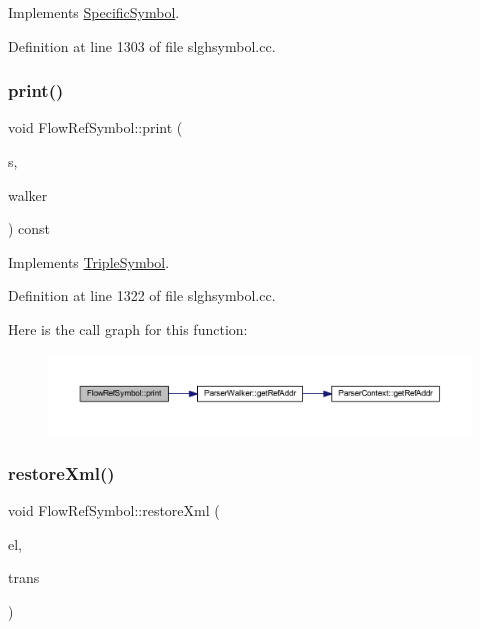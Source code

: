 Implements \mbox{\hyperlink{class_specific_symbol_abbde46a1f6af6c373420773d45e1e4e2}{Specific\+Symbol}}.



Definition at line 1303 of file slghsymbol.\+cc.

\mbox{\label{class_flow_ref_symbol_a8f6e9171c4a26b35f20e6026aafa94a2}} 
\subsubsection{\texorpdfstring{print()}{print()}}
{\footnotesize\ttfamily void Flow\+Ref\+Symbol\+::print (\begin{DoxyParamCaption}\item[{ostream \&}]{s,  }\item[{\mbox{\hyperlink{class_parser_walker}{Parser\+Walker}} \&}]{walker }\end{DoxyParamCaption}) const\hspace{0.3cm}{\ttfamily [virtual]}}



Implements \mbox{\hyperlink{class_triple_symbol_a205c4487d3ad54532097dd77eb4501fc}{Triple\+Symbol}}.



Definition at line 1322 of file slghsymbol.\+cc.

Here is the call graph for this function\+:
\nopagebreak
\begin{figure}[H]
\begin{center}
\leavevmode
\includegraphics[width=350pt]{class_flow_ref_symbol_a8f6e9171c4a26b35f20e6026aafa94a2_cgraph}
\end{center}
\end{figure}
\mbox{\label{class_flow_ref_symbol_a64565b89e176acc3743f31133548310d}} 
\subsubsection{\texorpdfstring{restoreXml()}{restoreXml()}}
{\footnotesize\ttfamily void Flow\+Ref\+Symbol\+::restore\+Xml (\begin{DoxyParamCaption}\item[{const \mbox{\hyperlink{class_element}{Element}} $\ast$}]{el,  }\item[{\mbox{\hyperlink{class_sleigh_base}{Sleigh\+Base}} $\ast$}]{trans }\end{DoxyParamCaption})\hspace{0.3cm}{\ttfamily [virtual]}}



